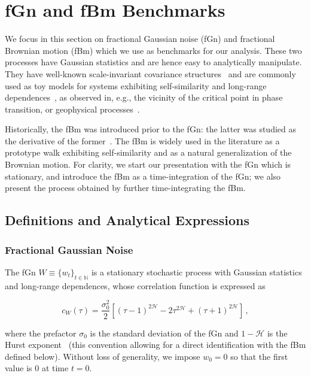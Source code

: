 \documentclass[aps,pra,groupedaddress,notitlepage]{revtex4-1}
\begin{document}
\section{fGn and fBm Benchmarks}
\label{sec:fGnfBm}

We focus in this section on fractional Gaussian noise (fGn) and fractional Brownian motion (fBm) which we use as benchmarks for our analysis.
These two processes have Gaussian statistics and are hence easy to analytically manipulate.
They have well-known scale-invariant covariance structures~\cite{Mandelbrot1968} and are commonly used as toy models for systems exhibiting self-similarity and long-range dependences~\cite{Kolmogorov1991}, as observed in, e.g., the vicinity of the critical point in phase transition, or geophysical processes~\cite{Pelletier1999}. 

Historically, the fBm was introduced prior to the fGn: the latter was studied as the derivative of the former~\cite{Mandelbrot1968}. The fBm is widely used in the literature as a prototype walk exhibiting self-similarity and as a natural generalization of the Brownian motion. For clarity, we start our presentation with the fGn which is stationary, and introduce the fBm as a time-integration of the fGn; we also present the process obtained by further time-integrating the fBm.

\subsection{Definitions and Analytical Expressions}

\subsubsection{Fractional Gaussian Noise} 
The fGn $W\equiv\{w_t\}_{t\in\mathbb{N}}$ is a stationary stochastic process with Gaussian statistics and long-range dependences, whose correlation function is expressed as 

\begin{equation}
c_{W}(\tau) = \frac{\sigma^2_{0}}{2} \left[ (\tau-1)^{2\mathcal{H}} -2 \tau^{2\mathcal{H}} + (\tau+1)^{2\mathcal{H}}  \right] \,, \label{def:fBm:correlation}
\end{equation}

\noindent where the prefactor $\sigma_0$ is the standard deviation of the fGn and $1-\mathcal{H}$ is the Hurst exponent~\cite{Mandelbrot1968} (this convention allowing for a direct identification with the fBm defined below). Without loss of generality, we impose $w_0=0$ so that the first value is 0 at time $t=0$.  
\end{document}
